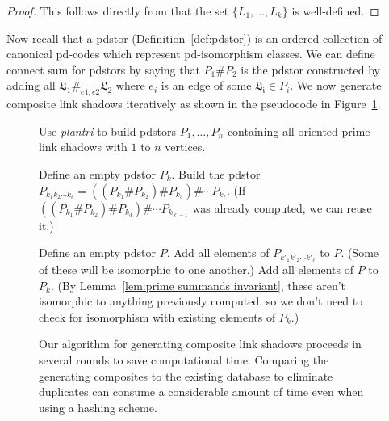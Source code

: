 \documentclass[amsmath,secnumarabic,floatfix,amssymb,nofootinbib,nobibnotes,letterpaper,11pt,tightenlines,showkeys]{revtex4}
\theoremstyle{definition}
\let\mgp=\marginpar \marginparwidth18mm \marginparsep1mm
\def\marginpar#1{\mgp{\raggedright\tiny #1}}
\let\lbl=\label
\def\label#1{\lbl{#1}\ifinner\else\marginpar{\ref{#1} #1}\ignorespaces\fi}
\begin{document}
\begin{proof} This follows directly from that the set $\{L_1, \dots, L_k\}$ is well-defined. \end{proof}

Now recall that a pdstor (Definition~\ref{def:pdstor}) is an ordered collection of canonical pd-codes which represent pd-isomorphism classes. We can define connect sum for pdstors by saying that $P_1 \# P_2$ is the pdstor constructed by adding all $\mathfrak{L_1} \#_{e1,e2} \mathfrak{L_2}$ where $e_i$ is an edge of some $\mathfrak{L_i} \in P_i$. We now generate composite link shadows iteratively as shown in the pseudocode in Figure~\ref{alg:build composites}. 

\begin{figure}[ht]
\begin{algorithmic}

\State Use \emph{plantri} to build pdstors $P_1, \dots, P_n$ containing all oriented prime link shadows with $1$ to $n$ vertices.

 	
 \State Define an empty pdstor $P_k$.
    \State  Build the pdstor $P_{k_1k_2\cdots k_\ell} = ((P_{k_1} \# P_{k_2}) \# P_{k_3}) \# \cdots P_{k_\ell}$.
    \State  (If $((P_{k_1} \# P_{k_2}) \# P_{k_3}) \# \cdots P_{k_{\ell-1}}$ was already computed, we can reuse it.)
 \EndFor

    \State Define an empty pdstor $P$.
       \State Add all elements of $P_{k'_1k'_2\cdots k'_\ell}$ to $P$.
      \State (Some of these will be isomorphic to one another.) 
    \EndFor
    \State Add all elements of $P$ to $P_k$. 
    \State (By Lemma~\ref{lem:prime summands invariant}, these aren't isomorphic to anything previously computed,
    \State so we don't need to check for isomorphism with existing elements of $P_k$.)
 \EndFor

\EndFor      
\EndProcedure
\end{algorithmic}
\caption{Our algorithm for generating composite link shadows proceeds in several rounds to save computational time. Comparing the generating composites to the existing database to eliminate duplicates can consume a considerable amount of time even when using a hashing scheme.}
\label{alg:build composites}
\end{figure}
\end{document}
